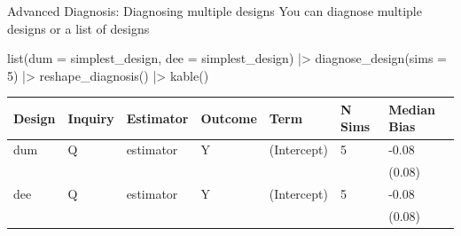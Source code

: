 \documentclass[
  11pt,
  ignorenonframetext,
]{beamer}
\newenvironment{Shaded}{\begin{snugshade}}{\end{snugshade}}
\newcommand{\AttributeTok}[1]{\textcolor[rgb]{0.40,0.45,0.13}{#1}}
\newcommand{\DecValTok}[1]{\textcolor[rgb]{0.68,0.00,0.00}{#1}}
\newcommand{\FunctionTok}[1]{\textcolor[rgb]{0.28,0.35,0.67}{#1}}
\newcommand{\NormalTok}[1]{\textcolor[rgb]{0.00,0.23,0.31}{#1}}
\newcommand{\SpecialCharTok}[1]{\textcolor[rgb]{0.37,0.37,0.37}{#1}}
\begin{document}
\begin{frame}[fragile]{Advanced Diagnosis: Diagnosing multiple designs}
\protect\hypertarget{advanced-diagnosis-diagnosing-multiple-designs}{}
You can diagnose multiple designs or a list of designs

\begin{Shaded}
\begin{Highlighting}[]
\FunctionTok{list}\NormalTok{(}\AttributeTok{dum =}\NormalTok{ simplest\_design, }\AttributeTok{dee =}\NormalTok{ simplest\_design) }\SpecialCharTok{|\textgreater{}}
  \FunctionTok{diagnose\_design}\NormalTok{(}\AttributeTok{sims =} \DecValTok{5}\NormalTok{) }\SpecialCharTok{|\textgreater{}}
  \FunctionTok{reshape\_diagnosis}\NormalTok{() }\SpecialCharTok{|\textgreater{}} 
  \FunctionTok{kable}\NormalTok{()}
\end{Highlighting}
\end{Shaded}

\begin{tabular}{l|l|l|l|l|l|l}
\hline
Design & Inquiry & Estimator & Outcome & Term & N Sims & Median Bias\\
\hline
dum & Q & estimator & Y & (Intercept) & 5 & -0.08\\
\hline
 &  &  &  &  &  & (0.08)\\
\hline
dee & Q & estimator & Y & (Intercept) & 5 & -0.08\\
\hline
 &  &  &  &  &  & (0.08)\\
\hline
\end{tabular}
\end{frame}
\end{document}

